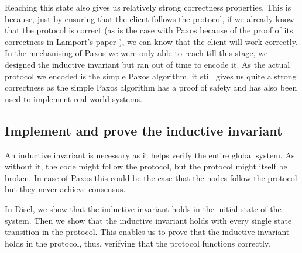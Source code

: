 Reaching this state also gives us relatively strong correctness properties. This
is because, just by ensuring that the client follows the protocol, if we already know
that the protocol is correct (as is the case with Paxos because of the proof of
its correctness in Lamport's paper \cite{4}), we can know that the client will work correctly.
In the mechanising of Paxos we were only able to reach till this stage,
we designed the inductive invariant but ran out of time to encode it.
As the actual protocol we encoded is the simple Paxos algorithm, it still
gives us quite a strong correctness as the simple Paxos algorithm has a proof
of safety and has also been used to implement real world systems.

\subsection{Implement and prove the inductive invariant}
An inductive invariant is necessary as it helps verify the entire
global system. As without it, the code might follow the protocol, but the
protocol might itself be broken. In case of Paxos this could be the case that
the nodes follow the protocol but they never achieve consensus.

In Disel, we show that the inductive invariant holds in the initial state of
the system. Then we show that the inductive invariant holds with every single
state transition in the protocol. This enables us to prove that the
inductive invariant holds in the protocol, thus, verifying that the protocol
functions correctly.
